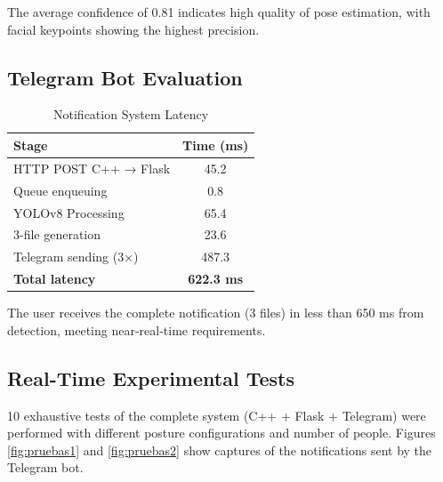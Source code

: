 \documentclass[conference]{IEEEtran}
\begin{document}
The average confidence of 0.81 indicates high quality of pose estimation, with facial keypoints showing the highest precision.

\subsection{Telegram Bot Evaluation}

\begin{table}[htbp]
\caption{Notification System Latency}
\begin{center}
\begin{tabular}{|l|c|}
\hline
\textbf{Stage} & \textbf{Time (ms)} \\
\hline
HTTP POST C++ → Flask & 45.2 \\
Queue enqueuing & 0.8 \\
YOLOv8 Processing & 65.4 \\
3-file generation & 23.6 \\
Telegram sending (3×) & 487.3 \\
\hline
\textbf{Total latency} & \textbf{622.3 ms} \\
\hline
\end{tabular}
\label{tab:bot_latency}
\end{center}
\end{table}

The user receives the complete notification (3 files) in less than 650 ms from detection, meeting near-real-time requirements.

\subsection{Real-Time Experimental Tests}

10 exhaustive tests of the complete system (C++ + Flask + Telegram) were performed with different posture configurations and number of people. Figures \ref{fig:pruebas1} and \ref{fig:pruebas2} show captures of the notifications sent by the Telegram bot.
\end{document}
